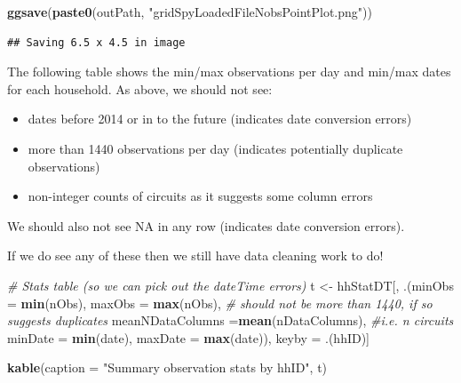 \documentclass[]{article}
\newenvironment{Shaded}{\begin{snugshade}}{\end{snugshade}}
\newcommand{\KeywordTok}[1]{\textcolor[rgb]{0.13,0.29,0.53}{\textbf{#1}}}
\newcommand{\DataTypeTok}[1]{\textcolor[rgb]{0.13,0.29,0.53}{#1}}
\newcommand{\StringTok}[1]{\textcolor[rgb]{0.31,0.60,0.02}{#1}}
\newcommand{\CommentTok}[1]{\textcolor[rgb]{0.56,0.35,0.01}{\textit{#1}}}
\newcommand{\NormalTok}[1]{#1}
\providecommand{\tightlist}{%
  \setlength{\itemsep}{0pt}\setlength{\parskip}{0pt}}
\begin{document}
\begin{Shaded}
\begin{Highlighting}[]
\KeywordTok{ggsave}\NormalTok{(}\KeywordTok{paste0}\NormalTok{(outPath, }\StringTok{"gridSpyLoadedFileNobsPointPlot.png"}\NormalTok{))}
\end{Highlighting}
\end{Shaded}

\begin{verbatim}
## Saving 6.5 x 4.5 in image
\end{verbatim}

The following table shows the min/max observations per day and min/max
dates for each household. As above, we should not see:

\begin{itemize}
\tightlist
\item
  dates before 2014 or in to the future (indicates date conversion
  errors)
\item
  more than 1440 observations per day (indicates potentially duplicate
  observations)
\item
  non-integer counts of circuits as it suggests some column errors
\end{itemize}

We should also not see NA in any row (indicates date conversion errors).

If we do see any of these then we still have data cleaning work to do!

\begin{Shaded}
\begin{Highlighting}[]
\CommentTok{# Stats table (so we can pick out the dateTime errors)}
\NormalTok{t <-}\StringTok{ }\NormalTok{hhStatDT[, .(}\DataTypeTok{minObs =} \KeywordTok{min}\NormalTok{(nObs),}
             \DataTypeTok{maxObs =} \KeywordTok{max}\NormalTok{(nObs), }\CommentTok{# should not be more than 1440, if so suggests duplicates}
             \DataTypeTok{meanNDataColumns =}\KeywordTok{mean}\NormalTok{(nDataColumns), }\CommentTok{#i.e. n circuits}
             \DataTypeTok{minDate =} \KeywordTok{min}\NormalTok{(date),}
             \DataTypeTok{maxDate =} \KeywordTok{max}\NormalTok{(date)),}
\NormalTok{         keyby =}\StringTok{ }\NormalTok{.(hhID)]}

\KeywordTok{kable}\NormalTok{(}\DataTypeTok{caption =} \StringTok{"Summary observation stats by hhID"}\NormalTok{, t)}
\end{Highlighting}
\end{Shaded}
\end{document}
